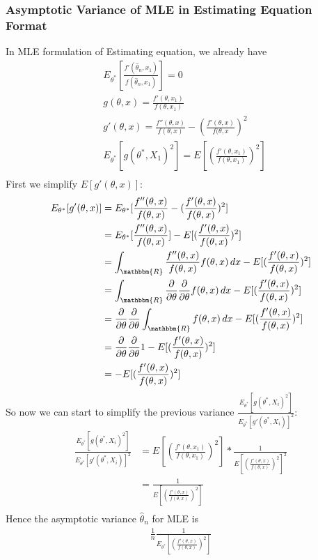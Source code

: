 \subsubsection{Asymptotic Variance of MLE in Estimating Equation Format} 
In MLE formulation of Estimating equation, we already have 
    \begin{align*}
        & E_{\theta^*}[\frac{f'(\hat{\theta}_n, x_1)}{f(\hat{\theta}_n, x_1)}] = 0 \\
        & g(\theta, x) = \frac{f'(\theta, x_1)}{f(\theta, x_1)}\\
        & g'(\theta, x) = \frac{f''(\theta,x)}{f(\theta,x)} - (\frac{f'(\theta,x)}{f(\theta,x})^2 \\
        & E_{\theta^*}[g(\theta^*, X_1)^2] = E[\left(\frac{f'(\theta, x_1)}{f(\theta, x_1)}\right)^2]\\
    \end{align*}
First we simplify $E[g'(\theta,x)]$: 
    \begin{align*}
        E_{\theta^*}[g'(\theta,x)]
        & = E_{\theta^*}[\frac{f''(\theta,x)}{f(\theta,x)} - (\frac{f'(\theta,x)}{f(\theta,x)})^2] \\
        & = E_{\theta^*}[\frac{f''(\theta,x)}{f(\theta,x)}] - E[ (\frac{f'(\theta,x)}{f(\theta,x)})^2]\\
        & = \int_{\mathbbm{R}} \frac{f''(\theta,x)}{f(\theta,x)} f(\theta, x) \,dx - E[ (\frac{f'(\theta,x)}{f(\theta,x)})^2]\\ 
        & = \int_{\mathbbm{R}} \partiald{\theta} \partiald{\theta} f(\theta, x) \,dx - E[ (\frac{f'(\theta,x)}{f(\theta,x)})^2]\\ 
        & = \partiald{\theta} \partiald{\theta} \int_{\mathbbm{R}} f(\theta, x) \,dx - E[ (\frac{f'(\theta,x)}{f(\theta,x)})^2]\\ 
        & = \partiald{\theta} \partiald{\theta} 1 - E[ (\frac{f'(\theta,x)}{f(\theta,x)})^2] \\
        & = - E[ (\frac{f'(\theta,x)}{f(\theta,x)})^2]
    \end{align*}
So now we can start to simplify the previous variance $\frac{E_{\theta^*}[g(\theta^*, X_i)^2]}{E_{\theta^*}[g'(\theta^*, X_i)]^2}$: 
    \begin{align*}
        \frac{E_{\theta^*}[g(\theta^*, X_i)^2]}{E_{\theta^*}[g'(\theta^*, X_i)]^2}
        & = E[\left(\frac{f'(\theta, x_1)}{f(\theta, x_1)}\right)^2] * \frac{1}{E[ (\frac{f'(\theta,x)}{f(\theta,x)})^2]^2}\\
        & = \frac{1}{E[ (\frac{f'(\theta,x)}{f(\theta,x)})^2]}\\
    \end{align*}
Hence the asymptotic variance $\hat{\theta}_n$ for MLE is 
    \begin{align*}
        \frac{1}{n} \frac{1}{E_{\theta^*}\left[ \left(\frac{f'(\theta,x)}{f(\theta,x)}\right)^2 \right]}
    \end{align*}
    
